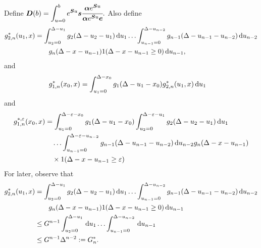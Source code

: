 Define \(\displaystyle\boldsymbol D(b) = \int_{u=0}^be^{\boldsymbol Su}\boldsymbol s \cfrac{\boldsymbol\alpha e^{\boldsymbol S u}}{\boldsymbol \alpha e^{\boldsymbol S u}\boldsymbol e}.\) Also define 
	\begin{align}
		g^*_{2,n}(u_1,x) &= \int_{u_2=0}^{\Delta-u_1}g_2(\Delta - u_2 - u_1)\, \mathrm{d} u_1 \dots \nonumber 
            	\int_{u_{n-1}=0}^{\Delta-u_{n-2}} g_{n-1}(\Delta - u_{n-1} - u_{n-2}) \, \mathrm{d} u_{n-2}
            	\\&\qquad{}g_{n}(\Delta - x-u_{n-1})1(\Delta-x-u_{n-1}\geq0)\, \mathrm{d} u_{n-1},
	\end{align}
	and 
	\begin{align}
		g^*_{1,n}(x_0,x) &= \int_{u_1=0}^{\Delta-x_0}g_1(\Delta - u_1 - x_0)g^*_{2,n}(u_1,x)\, \mathrm{d} u_1
	\end{align}
	and 
	\begin{align}
		g^{*,\varepsilon}_{1,n}(x_0,x) &= \int_{u_1=0}^{\Delta-\varepsilon-x_0}g_1(\Delta - u_1 - x_0)
		\int_{u_2=0}^{\Delta-\varepsilon-u_1}g_2(\Delta - u_2 - u_1)\, \mathrm{d} u_1  \nonumber 
		\\&\quad\hdots 
            	\int_{u_{n-1}=0}^{\Delta-\varepsilon-u_{n-2}} g_{n-1}(\Delta - u_{n-1} - u_{n-2}) \, \mathrm{d} u_{n-2}
            	g_{n}(\Delta-x-u_{n-1}) \nonumber 
		\\&\quad{}\times 1(\Delta-x-u_{n-1}\geq\varepsilon)
	\end{align}
	For later, observe that 
	\begin{align}
		g^*_{2,n}(u_1,x) &= \int_{u_2=0}^{\Delta-u_1}g_2(\Delta - u_2 - u_1)\, \mathrm{d} u_1 \dots \nonumber 
            	\int_{u_{n-1}=0}^{\Delta-u_{n-2}} g_{n-1}(\Delta - u_{n-1} - u_{n-2}) \, \mathrm{d} u_{n-2}
            	\\&\qquad{}g_{n}(\Delta - x-u_{n-1})1(\Delta-x-u_{n-1}\geq0)\, \mathrm{d} u_{n-1} \nonumber
		\\&\leq G^{n-1}\int_{u_2=0}^{\Delta-u_1}\, \mathrm{d} u_1 \dots\nonumber
            	\int_{u_{n-1}=0}^{\Delta-u_{n-2}}  \, \mathrm{d} u_{n-1}
		\\&\leq G^{n-1}\Delta^{n-2}:=G^*_n.
	\end{align}


